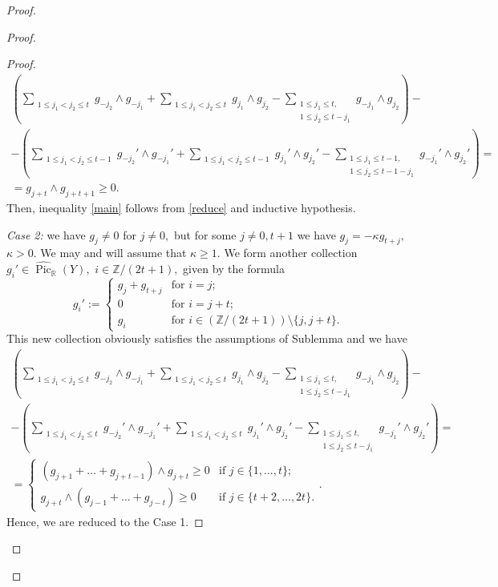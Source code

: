 \documentclass[11pt,leqno]{amsart}
\numberwithin{equation}{section}
\def\R{\mathbb{R}}
\def\Z{\mathbb{Z}}
\newcommand{\Pic}{\operatorname{Pic}}
\begin{document}
\begin{proof}
\begin{proof}
\begin{proof}
\begin{multline}\label{reduce}(\sum_{\substack{1\leq j_1<j_2\leq t}}g_{-j_2}\wedge g_{-j_1}
+\sum_{\substack{1\leq j_1<j_2\leq t}}g_{j_1}\wedge g_{j_2}-\sum_{\substack{1\leq j_1\leq t,\\
1\leq j_2\leq t-j_1}}g_{-j_1}\wedge g_{j_2})-\\
-(\sum_{\substack{1\leq j_1<j_2\leq t-1}}g_{-j_2}'\wedge g_{-j_1}'
+\sum_{\substack{1\leq j_1<j_2\leq t-1}}g_{j_1}'\wedge g_{j_2}'-\sum_{\substack{1\leq j_1\leq t-1,\\
1\leq j_2\leq t-1-j_1}}g_{-j_1}'\wedge g_{j_2}')=\\
=g_{j+t}\wedge g_{j+t+1}\geq 0.\end{multline}
Then, inequality \eqref{main} follows from \eqref{reduce} and inductive hypothesis.

{\it Case 2:} we have $g_j\ne 0$ for $j\ne 0,$ but for some $j\ne 0,t+1$ we have $g_j=-\kappa g_{t+j},$ $\kappa>0.$
We may and will assume that $\kappa\geq 1.$ We form another collection $g_i'\in\widehat{\Pic}_{\R}(Y),$
$i\in\Z/(2t+1),$ given by the formula
$$g_i':=\begin{cases}g_j+g_{t+j} &\text{for }i=j;\\
0 &\text{for }i=j+t;\\
g_i &\text{for }i\in(\Z/(2t+1))\setminus\{j,j+t\}.\end{cases}$$
This new collection obviously satisfies the assumptions of Sublemma and
we have
\begin{multline}\label{reduce2}(\sum_{\substack{1\leq j_1<j_2\leq t}}g_{-j_2}\wedge g_{-j_1}
+\sum_{\substack{1\leq j_1<j_2\leq t}}g_{j_1}\wedge g_{j_2}-\sum_{\substack{1\leq j_1\leq t,\\
1\leq j_2\leq t-j_1}}g_{-j_1}\wedge g_{j_2})-\\
-(\sum_{\substack{1\leq j_1<j_2\leq t}}g_{-j_2}'\wedge g_{-j_1}'                                     +\sum_{\substack{1\leq j_1<j_2\leq t}}g_{j_1}'\wedge g_{j_2}'-\sum_{\substack{1\leq j_1\leq t,\\
1\leq j_2\leq t-j_1}}g_{-j_1}'\wedge g_{j_2}')=\\
=\begin{cases}(g_{j+1}+\dots+g_{j+t-1})\wedge g_{j+t}\geq 0 &\text{if }j\in\{1,\dots,t\};\\
g_{j+t}\wedge (g_{j-1}+\dots+g_{j-t})\geq 0 &\text{if }j\in\{t+2,\dots,2t\}.\end{cases}.\end{multline}
Hence, we are reduced to the Case 1.


\end{proof}
\end{proof}
\end{proof}
\end{document}
